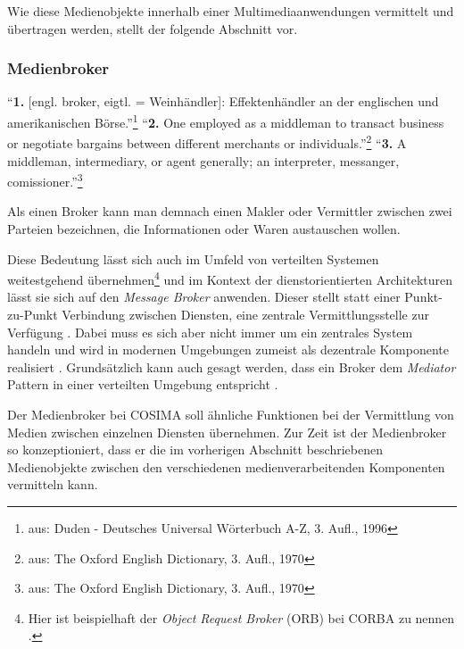 
  Wie diese Medienobjekte innerhalb einer Multimediaanwendungen vermittelt und übertragen werden, stellt der folgende Abschnitt vor.


\subsubsection{Medienbroker} %
\label{ssub:media_broker}

  \begin{definition}[Broker]\label{def:broker}
    "`\textbf{1.} [engl. broker, eigtl. = Weinhändler]: Effektenhändler an der englischen und amerikanischen Börse."'\footnote{aus: Duden - Deutsches Universal Wörterbuch A-Z, 3. Aufl., 1996} "`\textbf{2.} One employed as a middleman to transact business or negotiate bargains between different merchants or individuals."'\footnote{aus: The Oxford English Dictionary, 3. Aufl., 1970} "`\textbf{3.} A middleman, intermediary, or agent generally; an interpreter, messanger, comissioner."'\footnote{aus: The Oxford English Dictionary, 3. Aufl., 1970}
  \end{definition}

  Als einen Broker kann man demnach einen Makler oder Vermittler zwischen zwei Parteien bezeichnen, die Informationen oder Waren austauschen wollen.

  Diese Bedeutung lässt sich auch im Umfeld von verteilten Systemen weitestgehend über\-nehmen\footnote{Hier ist beispielhaft der \emph{Object Request Broker} (ORB) bei CORBA zu nennen \citep{coulouris2001ds,balzert1999lo}.} und im Kontext der dienstorientierten Architekturen lässt sie sich auf den \emph{Message Broker} anwenden. Dieser stellt statt einer Punkt-zu-Punkt Verbindung zwischen Diensten, eine zentrale Vermittlungsstelle zur Verfügung \citep[S. 71]{web_services}. Dabei muss es sich aber nicht immer um ein zentrales System handeln und wird in modernen Umgebungen zumeist als dezentrale Komponente realisiert \citep{enterprise_service_bus}. Grundsätzlich kann auch gesagt werden, dass ein Broker dem \emph{Mediator} Pattern \citep[S. 273]{design_patterns} in einer verteilten Umgebung entspricht \citep[S. 83]{enterprise_integration_patterns}.
  
  Der Medienbroker bei COSIMA soll ähnliche Funktionen bei der Vermittlung von Medien zwischen einzelnen Diensten übernehmen. Zur Zeit ist der Medienbroker so konzeptioniert, dass er die im vorherigen Abschnitt beschriebenen Medienobjekte zwischen den verschiedenen medienverarbeitenden Komponenten vermitteln kann.
  
